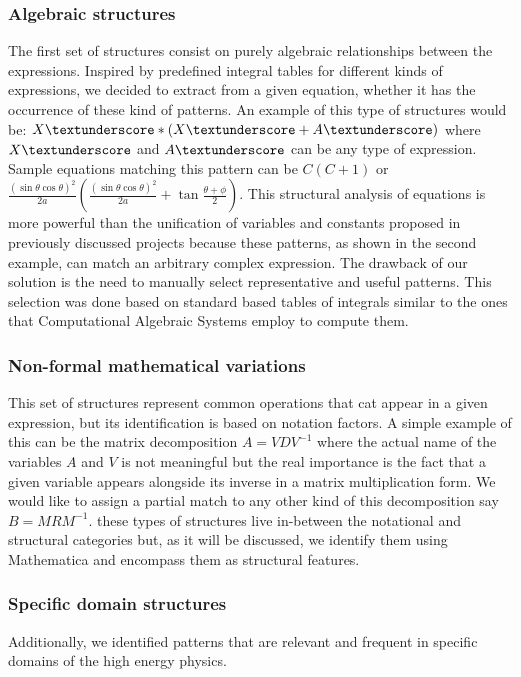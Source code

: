 \subsubsection{Algebraic structures}
The first set of structures consist on purely algebraic relationships between the expressions.
Inspired by predefined integral tables for different kinds of expressions, we decided to extract from a given equation, whether it has the occurrence of these kind of patterns.
An example of this type of structures would be: $X\textunderscore*(X\textunderscore + A\textunderscore)$ where $X\textunderscore$ and $A\textunderscore$ can be any type of expression. Sample equations matching this pattern can be $C (C+1)$ or $\frac{(\sin{\theta}\cos{\theta})^2}{2a} (\frac{(\sin{\theta}\cos{\theta})^2}{2a} + \tan{\frac{\theta+\phi}{2}})$. This structural analysis of equations is more powerful than the unification of variables and constants proposed in previously discussed projects because these patterns, as shown in the second example, can match an arbitrary complex expression. The drawback of our solution is the need to manually select representative and useful patterns. This selection was done based on standard based tables of integrals similar to the ones that Computational Algebraic Systems employ to compute them.

\subsubsection{Non-formal mathematical variations}
This set of structures represent common operations that cat appear in a given expression, but its identification is based on notation factors. A simple example of this can be the matrix decomposition $A = VDV^{-1}$ where the actual name of the variables $A$ and $V$ is not meaningful but the real importance is the fact that a given variable appears alongside its inverse in a matrix multiplication form. We would like to assign a partial match to any other kind of this decomposition say $B = MRM^{-1}$. these types of structures live in-between the notational and structural categories but, as it will be discussed, we identify them using Mathematica and encompass them as structural features.

\subsubsection{Specific domain structures}
Additionally, we identified patterns that are relevant and frequent in specific domains of the high energy physics.


